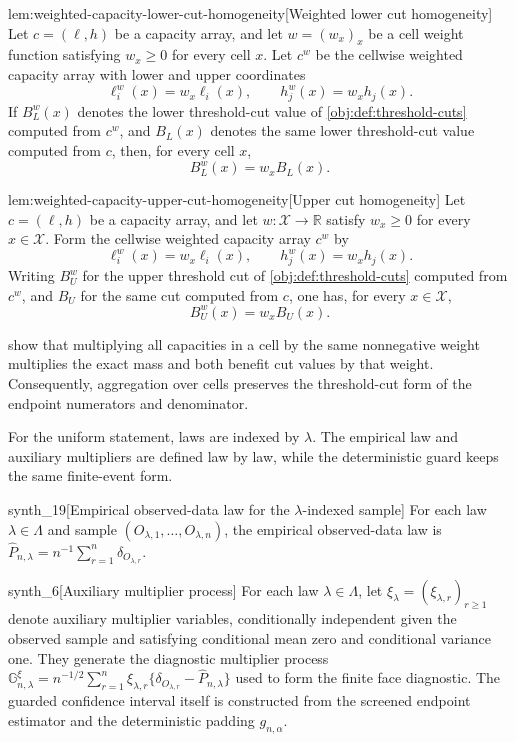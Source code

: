 \begin{lemmav}{lem:weighted-capacity-lower-cut-homogeneity}[Weighted lower cut homogeneity]
Let \(c=(\ell,h)\) be a capacity array, and let \(w=(w_x)_x\) be a cell weight function satisfying \(w_x\ge 0\) for every cell \(x\).  Let \(c^w\) be the cellwise weighted capacity array with lower and upper coordinates
\[
\ell_i^w(x)=w_x\ell_i(x),
\qquad
h_j^w(x)=w_xh_j(x).
\]
If \(B_L^w(x)\) denotes the lower threshold-cut value of \cref{obj:def:threshold-cuts} computed from \(c^w\), and \(B_L(x)\) denotes the same lower threshold-cut value computed from \(c\), then, for every cell \(x\),
\[
B_L^w(x)=w_x B_L(x).
\]
\end{lemmav}

\begin{lemmav}{lem:weighted-capacity-upper-cut-homogeneity}[Upper cut homogeneity]
Let \(c=(\ell,h)\) be a capacity array, and let \(w:\mathcal X\to\mathbb R\) satisfy \(w_x\ge 0\) for every \(x\in\mathcal X\).  Form the cellwise weighted capacity array \(c^w\) by
\[
\ell_i^w(x)=w_x\ell_i(x),
\qquad
h_j^w(x)=w_xh_j(x).
\]
Writing \(B_U^w\) for the upper threshold cut of \cref{obj:def:threshold-cuts} computed from \(c^w\), and \(B_U\) for the same cut computed from \(c\), one has, for every \(x\in\mathcal X\),
\[
B_U^w(x)=w_x B_U(x).
\]
\end{lemmav}

 show that multiplying all capacities in a cell by the same nonnegative weight multiplies the exact mass and both benefit cut values by that weight.  Consequently, aggregation over cells preserves the threshold-cut form of the endpoint numerators and denominator.

For the uniform statement, laws are indexed by \(\lambda\).  The empirical law and auxiliary multipliers are defined law by law, while the deterministic guard keeps the same finite-event form.

\begin{definitionv}{synth_19}[Empirical observed-data law for the \(\lambda\)-indexed sample]
For each law \(\lambda\in\Lambda\) and sample \((O_{\lambda,1},\ldots,O_{\lambda,n})\), the empirical observed-data law is \(\widehat P_{n,\lambda}=n^{-1}\sum_{r=1}^n\delta_{O_{\lambda,r}}\).
\end{definitionv}

\begin{definitionv}{synth_6}[Auxiliary multiplier process]
For each law $\lambda\in\Lambda$, let $\xi_\lambda=(\xi_{\lambda,r})_{r\ge1}$ denote auxiliary multiplier variables, conditionally independent given the observed sample and satisfying conditional mean zero and conditional variance one. They generate the diagnostic multiplier process $\mathbb G_{n,\lambda}^{\xi}=n^{-1/2}\sum_{r=1}^n\xi_{\lambda,r}\{\delta_{O_{\lambda,r}}-\widehat P_{n,\lambda}\}$ used to form the finite face diagnostic. The guarded confidence interval itself is constructed from the screened endpoint estimator and the deterministic padding $g_{n,\alpha}$.
\end{definitionv}

